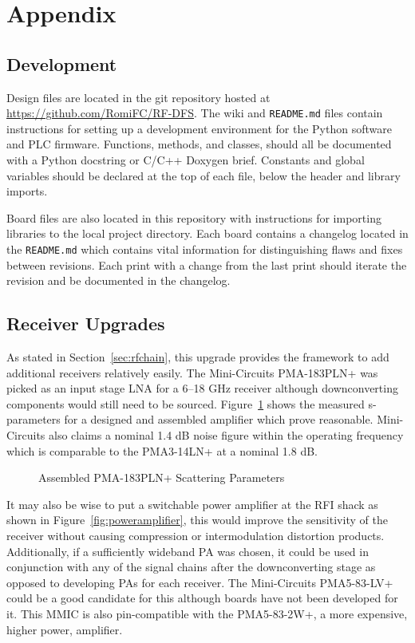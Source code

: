 \documentclass[titlepage]{article}
\begin{document}
\section{Appendix}
\subsection{Development}
Design files are located in the git repository hosted at \url{https://github.com/RomiFC/RF-DFS}. The wiki and \verb|README.md| files contain instructions for setting up a development environment for the Python software and PLC firmware. Functions, methods, and classes, should all be documented with a Python docstring or C/C++ Doxygen brief. Constants and global variables should be declared at the top of each file, below the header and library imports.

Board files are also located in this repository with instructions for importing libraries to the local project directory. Each board contains a changelog located in the \verb|README.md| which contains vital information for distinguishing flaws and fixes between revisions. Each print with a change from the last print should iterate the revision and be documented in the changelog.

\subsection{Receiver Upgrades}
As stated in Section~\ref{sec:rfchain}, this upgrade provides the framework to add additional receivers relatively easily. The Mini-Circuits PMA-183PLN+ was picked as an input stage LNA for a 6--18 GHz receiver although downconverting components would still need to be sourced. Figure~\ref{fig:pma183} shows the measured s-parameters for a designed and assembled amplifier which prove reasonable. Mini-Circuits also claims a nominal 1.4 dB noise figure within the operating frequency which is comparable to the PMA3-14LN+ at a nominal 1.8 dB.

\begin{figure}[!ht]
  \begin{center}
    
  \end{center}
  \caption{Assembled PMA-183PLN+ Scattering Parameters}\label{fig:pma183}
\end{figure}

It may also be wise to put a switchable power amplifier at the RFI shack as shown in Figure~\ref{fig:poweramplifier}, this would improve the sensitivity of the receiver without causing compression or intermodulation distortion products. Additionally, if a sufficiently wideband PA was chosen, it could be used in conjunction with any of the signal chains after the downconverting stage as opposed to developing PAs for each receiver. The Mini-Circuits PMA5-83-LV+ could be a good candidate for this although boards have not been developed for it. This MMIC is also pin-compatible with the PMA5-83-2W+, a more expensive, higher power, amplifier.
\end{document}
